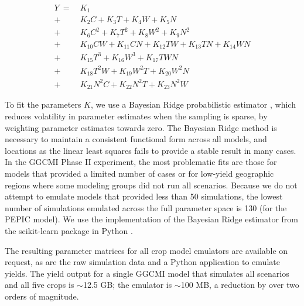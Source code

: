 \documentclass[preprint, 5p, times, twocolumn]{elsarticle}
\begin{document}
\begin{align}
    \label{eqn:features_final}
    Y\ = \ & K_{1}  \\
       + \ & K_{2}  C     + K_{3}  T     + K_{4}  W     + K_{5}  N   \nonumber \\
       + \ & K_{6}  C^2   + K_{7}  T^2   + K_{8}  W^2   + K_{9}  N^2 \nonumber \\
       + \ & K_{10} C W   + K_{11} C N   + K_{12} T W   + K_{13} T N + K_{14} W N \nonumber \\ %
       + \ & K_{15} T^3   + K_{16} W^3   + K_{17} T W N  \nonumber \\ %
       + \ & K_{18} T^2 W + K_{19} W^2 T + K_{20} W^2 N  \nonumber \\ %
       + \ & K_{21} N^2 C + K_{22} N^2 T + K_{23} N^2 W  \nonumber    %
\end{align}

To fit the parameters $K$, we use a Bayesian Ridge probabilistic estimator \citep{MacKay91}, which reduces volatility in parameter estimates when the sampling is sparse, by weighting parameter estimates towards zero. The Bayesian Ridge method is necessary to maintain a consistent functional form across all models, and locations as the linear least squares fails to provide a stable result in many cases. In the GGCMI Phase II experiment, the most problematic fits are those for models that provided a limited number of cases or for low-yield geographic regions where some modeling groups did not run all scenarios. Because we do not attempt to emulate models that provided less than 50 simulations, the lowest number of simulations emulated across the full parameter space is 130 (for the PEPIC model). We use the implementation of the Bayesian Ridge estimator from the scikit-learn package in Python \citep{scikit-learn}. 

The resulting parameter matrices for all crop model emulators are available on request, as are the raw simulation data and a Python application to emulate yields. The yield output for a single GGCMI model that simulates all scenarios and all five crops is $\sim$12.5 GB; the emulator is $\sim$100 MB, a reduction by over two orders of magnitude. 
\end{document}
